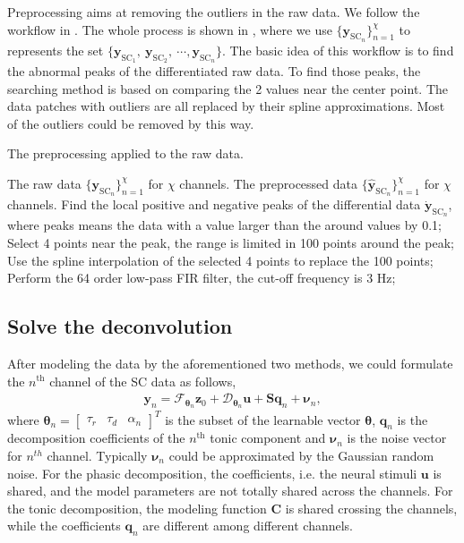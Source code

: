 \documentclass[10pt,conference]{ieeeconf}
\begin{document}
Preprocessing aims at removing the outliers in the raw data. We follow the workflow in \cite{amin2019robust}. The whole process is shown in , where we use $\{\mathbf{y}_{\mathrm{SC}_n}\}_{n=1}^\chi$ to represents the set $\{\mathbf{y}_{\mathrm{SC}_1},~\mathbf{y}_{\mathrm{SC}_2},~\cdots,\mathbf{y}_{\mathrm{SC}_n}\}$. The basic idea of this workflow is to find the abnormal peaks of the differentiated raw data. To find those peaks, the searching method is based on comparing the 2 values near the center point. The data patches with outliers are all replaced by their spline approximations. Most of the outliers could be removed by this way.
\begin{algorithm}[tb]
  \caption{The preprocessing applied to the raw data.}
  \label{alg:preprocessing}
  \begin{algorithmic}[1]
    \REQUIRE The raw data $\{\mathbf{y}_{\mathrm{SC}_n}\}_{n=1}^\chi$ for $\chi$ channels.
    \ENSURE The preprocessed data $\{\hat{\mathbf{y}}_{\mathrm{SC}_n}\}_{n=1}^\chi$ for $\chi$ channels.
    \STATE Find the local positive and negative peaks of the differential data $\dot{\mathbf{y}}_{\mathrm{SC}_n}$, where peaks means the data with a value larger than the around values by 0.1;
    \STATE Select 4 points near the peak, the range is limited in 100 points around the peak;
    \STATE Use the spline interpolation of the selected 4 points to replace the 100 points;
    \ENDFOR
    \STATE Perform the 64 order low-pass FIR filter, the cut-off frequency is 3 Hz;
    \ENDFOR
  \end{algorithmic}
\end{algorithm}

\subsection{Solve the deconvolution}

After modeling the data by the aforementioned two methods, we could formulate the $n^{\mathrm{th}}$ channel of the SC data as follows,
\begin{align}
\mathbf{y}_n = \mathcal{F}_{\boldsymbol{\theta}_n} \mathbf{z}_{0} + \mathcal{D}_{\boldsymbol{\theta}_n} \mathbf{u} + \mathbf{S} \mathbf{q}_n + \boldsymbol{\nu}_n,
\end{align}
where $\boldsymbol{\theta}_n = \begin{bmatrix}
\tau_r & \tau_d & \alpha_n
\end{bmatrix}^T$ is the subset of the learnable vector $\boldsymbol{\theta}$, $\mathbf{q}_n$ is the decomposition coefficients of the $n^{\mathrm{th}}$ tonic component and $\boldsymbol{\nu}_n$ is the noise vector for $n^{th}$ channel. Typically $\boldsymbol{\nu}_n$ could be approximated by the Gaussian random noise. For the phasic decomposition, the coefficients, i.e. the neural stimuli $\mathbf{u}$ is shared, and the model parameters are not totally shared across the channels. For the tonic decomposition, the modeling function $\mathbf{C}$ is shared crossing the channels, while the coefficients $\mathbf{q}_n$ are different among different channels.
\end{document}
